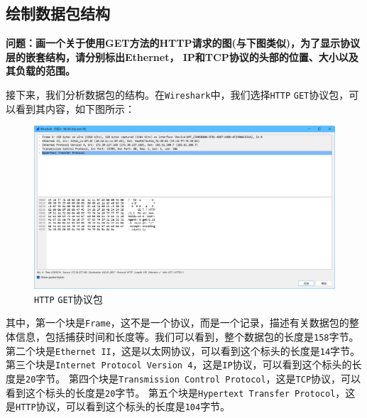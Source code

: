 \documentclass{article}
\begin{document}
\subsection{绘制数据包结构}

\textbf{问题：画一个关于使用GET方法的HTTP请求的图(与下图类似)，为了显示协议层的嵌套结构，请分别标出Ethernet， IP和TCP协议的头部的位置、大小以及其负载的范围。}

接下来，我们分析数据包的结构。在\texttt{Wireshark}中，我们选择\texttt{HTTP} \texttt{GET}协议包，可以看到其内容，如下图所示：

\begin{figure}[H]
  \centering
  \includegraphics[width=15cm]{images/04.png}
  \caption{\texttt{HTTP} \texttt{GET}协议包}
\end{figure}

其中，第一个块是\texttt{Frame}，这不是一个协议，而是一个记录，描述有关数据包的整体信息，包括捕获时间和长度等。我们可以看到，整个数据包的长度是\texttt{158}字节。
第二个块是\texttt{Ethernet II}，这是以太网协议，可以看到这个标头的长度是\texttt{14}字节。
第三个块是\texttt{Internet Protocol Version 4}，这是\texttt{IP}协议，可以看到这个标头的长度是\texttt{20}字节。
第四个块是\texttt{Transmission Control Protocol}，这是\texttt{TCP}协议，可以看到这个标头的长度是\texttt{20}字节。
第五个块是\texttt{Hypertext Transfer Protocol}，这是\texttt{HTTP}协议，可以看到这个标头的长度是\texttt{104}字节。
\end{document}
